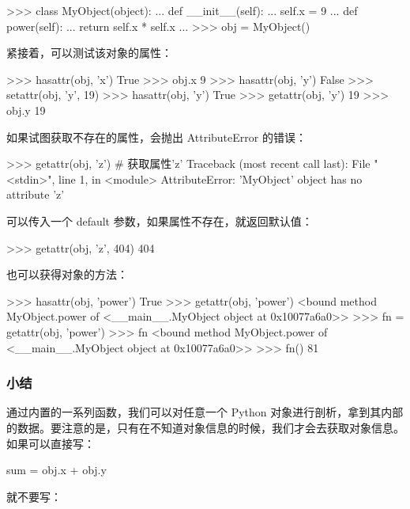 \begin{pythoncode}
>>> class MyObject(object):
...     def __init__(self):
...         self.x = 9
...     def power(self):
...         return self.x * self.x
...
>>> obj = MyObject()
\end{pythoncode}

紧接着，可以测试该对象的属性：

\begin{pythoncode}
>>> hasattr(obj, 'x') 
True
>>> obj.x
9
>>> hasattr(obj, 'y') 
False
>>> setattr(obj, 'y', 19) 
>>> hasattr(obj, 'y') 
True
>>> getattr(obj, 'y') 
19
>>> obj.y 
19
\end{pythoncode}

如果试图获取不存在的属性，会抛出 AttributeError 的错误：

\begin{pythoncode}
>>> getattr(obj, 'z') # 获取属性'z'
Traceback (most recent call last):
  File "<stdin>", line 1, in <module>
AttributeError: 'MyObject' object has no attribute 'z'
\end{pythoncode}

可以传入一个 default 参数，如果属性不存在，就返回默认值：

\begin{pythoncode}
>>> getattr(obj, 'z', 404) 
404
\end{pythoncode}

也可以获得对象的方法：

\begin{pythoncode}
>>> hasattr(obj, 'power') 
True
>>> getattr(obj, 'power') 
<bound method MyObject.power of <__main__.MyObject object at 0x10077a6a0>>
>>> fn = getattr(obj, 'power') 
>>> fn 
<bound method MyObject.power of <__main__.MyObject object at 0x10077a6a0>>
>>> fn() 
81
\end{pythoncode}

\hypertarget{ux5c0fux7ed3}{%
\subsubsection{小结}\label{ux5c0fux7ed3}}

通过内置的一系列函数，我们可以对任意一个 Python
对象进行剖析，拿到其内部的数据。要注意的是，只有在不知道对象信息的时候，我们才会去获取对象信息。如果可以直接写：

\begin{pythoncode}
sum = obj.x + obj.y
\end{pythoncode}

就不要写：

